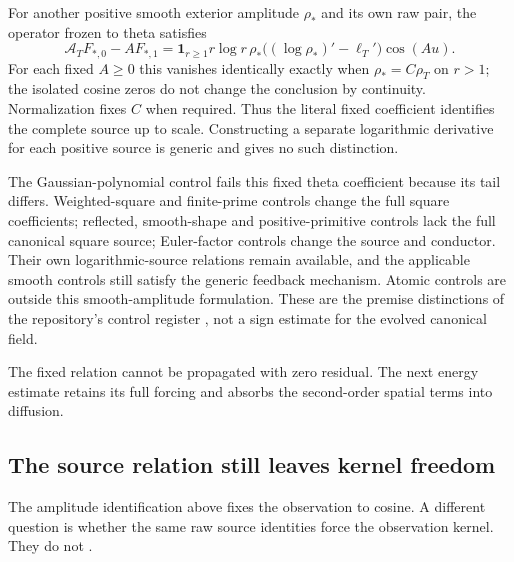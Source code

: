 \documentclass[11pt]{article}
\numberwithin{equation}{section}
\begin{document}
For another positive smooth exterior amplitude $\rho_*$ and its own
raw pair, the operator frozen to theta satisfies
\begin{equation}\label{eq:sourcecomparison}
 \mathcal A_TF_{*,0}-AF_{*,1}
 =\mathbf1_{r\ge1}r\log r\,\rho_*
       \big((\log\rho_*)'-\ell_T'\big)\cos(Au).
\end{equation}
For each fixed $A\ge0$ this vanishes identically exactly when
$\rho_*=C\rho_T$ on $r>1$; the isolated cosine zeros do not change
the conclusion by continuity. Normalization fixes $C$ when required.
Thus the literal fixed coefficient identifies the complete source up
to scale. Constructing a separate logarithmic derivative for each
positive source is generic and gives no such distinction.

The Gaussian-polynomial control fails this fixed theta coefficient
because its tail differs. Weighted-square and finite-prime controls
change the full square coefficients; reflected, smooth-shape and
positive-primitive controls lack the full canonical square source;
Euler-factor controls change the source and conductor. Their own
logarithmic-source relations remain available, and the applicable
smooth controls still satisfy the generic feedback mechanism.
Atomic controls are outside this smooth-amplitude formulation.
These are the premise distinctions of the repository's control
register \cite{CollisionControls}, not a sign estimate for the
evolved canonical field.

The fixed relation cannot be propagated with zero residual.
The next energy estimate retains its full forcing and absorbs the
second-order spatial terms into diffusion.

\subsection{The source relation still leaves kernel freedom}

The amplitude identification above fixes the observation to cosine.
A different question is whether the same raw source identities force
the observation kernel. They do not \cite{KernelFreedomNote}.
\end{document}
